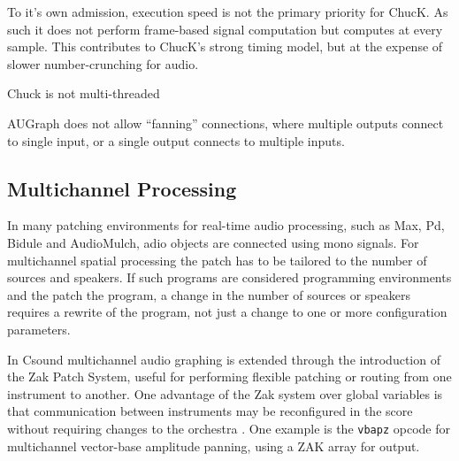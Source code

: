 \documentclass[twoside,a4paper]{article}
\begin{document}
To it's own admission, execution speed is not the primary priority for ChucK.  As such it does not perform frame-based signal computation but computes at every sample.  This contributes to ChucK's strong timing model, but at the expense of slower number-crunching for audio.


Chuck is not multi-threaded

AUGraph does not allow ``fanning'' connections, where multiple outputs connect to single input, or a single output connects to multiple inputs.



\subsection{Multichannel Processing} %

In many patching environments for real-time audio processing, such as Max, Pd, Bidule and AudioMulch, adio objects are connected using mono signals. For multichannel spatial processing the patch has to be tailored to the number of sources and speakers. If such programs are considered programming environments and the patch the program, a change in the number of sources or speakers requires a rewrite of the program, not just a change to one or more configuration parameters.


In Csound multichannel audio graphing is extended through the introduction of the Zak Patch System, useful for performing flexible patching or routing from one instrument to another. One advantage of the Zak system over global variables is that communication between instruments may be reconfigured in the score without requiring changes to the orchestra \cite{Mikelson:2000}. One example is the \texttt{vbapz} opcode for multichannel vector-base amplitude panning, using a ZAK array for output.
\end{document}
